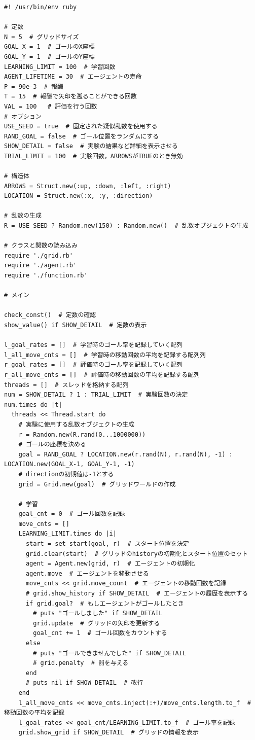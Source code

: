 \documentclass[a4j,11pt]{jarticle}
\begin{document}
\begin{verbatim}
#! /usr/bin/env ruby

# 定数
N = 5  # グリッドサイズ
GOAL_X = 1  # ゴールのX座標
GOAL_Y = 1  # ゴールのY座標
LEARNING_LIMIT = 100  # 学習回数
AGENT_LIFETIME = 30  # エージェントの寿命
P = 90e-3  # 報酬
T = 15  # 報酬で矢印を遡ることができる回数
VAL = 100   # 評価を行う回数
# オプション
USE_SEED = true  # 固定された疑似乱数を使用する
RAND_GOAL = false  # ゴール位置をランダムにする
SHOW_DETAIL = false  # 実験の結果など詳細を表示させる
TRIAL_LIMIT = 100  # 実験回数，ARROWSがTRUEのとき無効

# 構造体
ARROWS = Struct.new(:up, :down, :left, :right)
LOCATION = Struct.new(:x, :y, :direction)

# 乱数の生成
R = USE_SEED ? Random.new(150) : Random.new()  # 乱数オブジェクトの生成

# クラスと関数の読み込み
require './grid.rb'
require './agent.rb'
require './function.rb'

# メイン

check_const()  # 定数の確認
show_value() if SHOW_DETAIL  # 定数の表示

l_goal_rates = []  # 学習時のゴール率を記録していく配列
l_all_move_cnts = []  # 学習時の移動回数の平均を記録する配列列
r_goal_rates = []  # 評価時のゴール率を記録していく配列
r_all_move_cnts = []  # 評価時の移動回数の平均を記録する配列
threads = []  # スレッドを格納する配列
num = SHOW_DETAIL ? 1 : TRIAL_LIMIT  # 実験回数の決定
num.times do |t|
  threads << Thread.start do
    # 実験に使用する乱数オブジェクトの生成
    r = Random.new(R.rand(0...1000000))
    # ゴールの座標を決める
    goal = RAND_GOAL ? LOCATION.new(r.rand(N), r.rand(N), -1) : LOCATION.new(GOAL_X-1, GOAL_Y-1, -1)
    # directionの初期値は-1とする
    grid = Grid.new(goal)  # グリッドワールドの作成

    # 学習
    goal_cnt = 0  # ゴール回数を記録
    move_cnts = []
    LEARNING_LIMIT.times do |i|
      start = set_start(goal, r)  # スタート位置を決定
      grid.clear(start)  # グリッドのhistoryの初期化とスタート位置のセット
      agent = Agent.new(grid, r)  # エージェントの初期化
      agent.move  # エージェントを移動させる
      move_cnts << grid.move_count  # エージェントの移動回数を記録
      # grid.show_history if SHOW_DETAIL  # エージェントの履歴を表示する
      if grid.goal?  # もしエージェントがゴールしたとき
        # puts "ゴールしました" if SHOW_DETAIL
        grid.update  # グリッドの矢印を更新する
        goal_cnt += 1  # ゴール回数をカウントする
      else
        # puts "ゴールできませんでした" if SHOW_DETAIL
        # grid.penalty  # 罰を与える
      end
      # puts nil if SHOW_DETAIL  # 改行
    end
    l_all_move_cnts << move_cnts.inject(:+)/move_cnts.length.to_f  # 移動回数の平均を記録
    l_goal_rates << goal_cnt/LEARNING_LIMIT.to_f  # ゴール率を記録
    grid.show_grid if SHOW_DETAIL  # グリッドの情報を表示


\end{verbatim}
\end{document}
